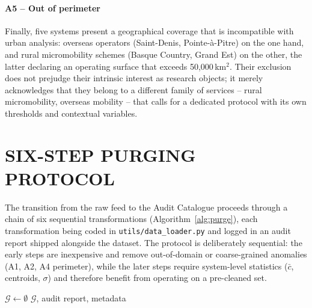 \documentclass[a4paper,twoside]{article}
\begin{document}
\paragraph{A5 -- Out of perimeter}
Finally, five systems present a geographical coverage that is
incompatible with urban analysis: overseas operators
(Saint-Denis, Pointe-\`a-Pitre) on the one hand, and rural
micromobility schemes (Basque Country, Grand Est) on the other,
the latter declaring an operating surface that exceeds
50{,}000\,km$^2$. Their exclusion does not prejudge their
intrinsic interest as research objects; it merely acknowledges
that they belong to a different family of services -- rural
micromobility, overseas mobility -- that calls for a dedicated
protocol with its own thresholds and contextual variables.

\section{\uppercase{Six-Step Purging Protocol}}
\label{secProtocol}

The transition from the raw feed to the Audit Catalogue proceeds
through a chain of six sequential transformations
(Algorithm~\ref{alg:purge}), each transformation being coded in
\texttt{utils/data\_loader.py} and logged in an audit report
shipped alongside the dataset. The protocol is deliberately
sequential: the early steps are inexpensive and remove
out-of-domain or coarse-grained anomalies (A1, A2, A4 perimeter),
while the later steps require system-level statistics
($\bar c$, centroids, $\sigma$) and therefore benefit from
operating on a pre-cleaned set.

\begin{algorithm}[ht]
\SetAlgoLined
\DontPrintSemicolon
{}
$\mathcal{G} \gets \emptyset$\;
\Return $\mathcal{G}$, audit report, metadata\;
\caption{GBFS-to-Gold-Standard purging pipeline.}
\label{alg:purge}
\end{algorithm}
\end{document}
